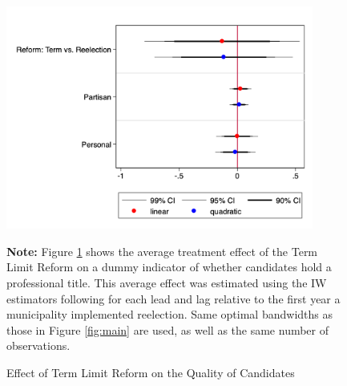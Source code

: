 \documentclass[12pt]{amsart}
\numberwithin{equation}{section}
\theoremstyle{definition}
\theoremstyle{definition}
\theoremstyle{definition}
\begin{document}
 \begin{figure}[h]   
\centering
 \caption{Effect of Term Limit Reform on the Quality of Candidates}
 \label{fig:quality_trend}
\includegraphics[width=0.9\textwidth]{Figures_incumbency/quality.png}
       \captionsetup{justification=centering}
         
 \textbf{Note:} Figure \ref{fig:quality_trend} shows the average treatment effect of the Term Limit Reform on a dummy indicator of whether candidates hold a professional title. This average effect was estimated using the IW estimators following \citet{abraham_sun_2020} for each lead and lag relative to the first year a municipality implemented reelection. Same optimal bandwidths as those in Figure \ref{fig:main} are used, as well as the same number of observations.   
     
\end{figure}   
\end{document}
